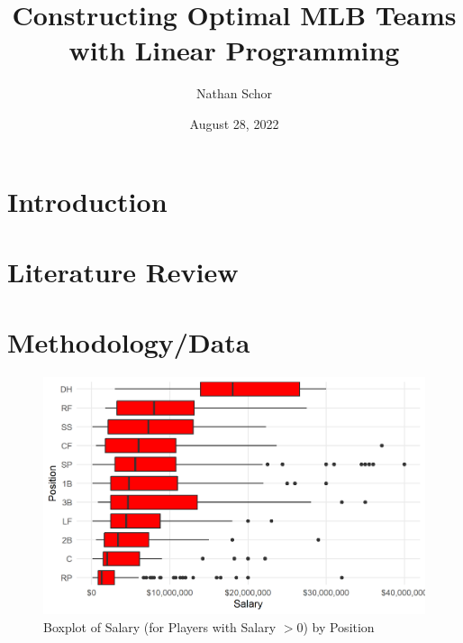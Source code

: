 \documentclass{article}
\title{Constructing Optimal MLB Teams with Linear Programming}
\author{Nathan Schor}
\date{August 28, 2022}
\begin{document}
\maketitle
\begin{singlespace}
\tableofcontents
\end{singlespace}

\section{Introduction}

\section{Literature Review}

\section{Methodology/Data}



\begin{figure}[h]
\caption{Boxplot of Salary (for Players with Salary $> 0$) by Position}
\label{fig:salary_position_boxplot}
\centering
\includegraphics[width=0.7\paperwidth, scale=1.25]{salary_position_boxplots.png}
\end{figure}
\end{document}
